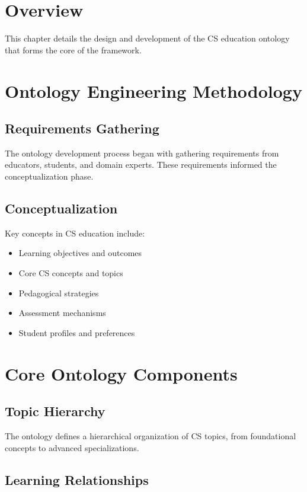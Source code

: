 \section{Overview}

This chapter details the design and development of the CS education ontology that forms the core of the framework.

\section{Ontology Engineering Methodology}

\subsection{Requirements Gathering}

The ontology development process began with gathering requirements from educators, students, and domain experts. These requirements informed the conceptualization phase.

\subsection{Conceptualization}

Key concepts in CS education include:
\begin{itemize}
    \item Learning objectives and outcomes
    \item Core CS concepts and topics
    \item Pedagogical strategies
    \item Assessment mechanisms
    \item Student profiles and preferences
\end{itemize}

\section{Core Ontology Components}

\subsection{Topic Hierarchy}

The ontology defines a hierarchical organization of CS topics, from foundational concepts to advanced specializations.

\subsection{Learning Relationships}

